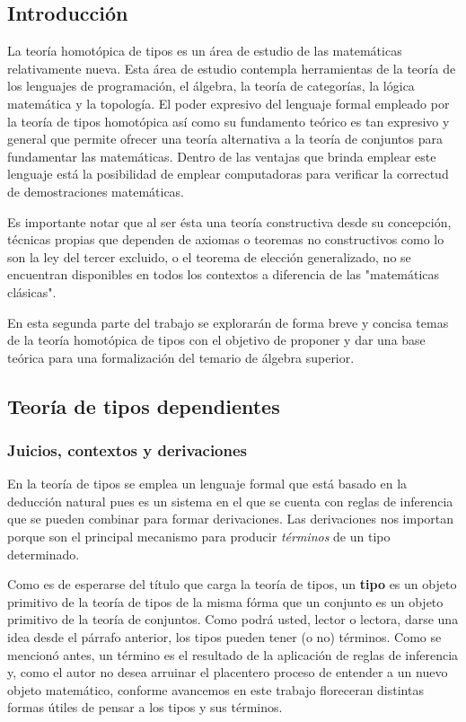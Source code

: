 \documentclass{article}
\begin{document}
\subsection{Introducción}
La teoría homotópica de tipos es un área de estudio de las matemáticas relativamente nueva. 
Esta área de estudio contempla herramientas de la teoría de los lenguajes de programación, el álgebra, la teoría de categorías, la lógica matemática y la topología.
El poder expresivo del lenguaje formal empleado por la teoría de tipos homotópica así como su fundamento teórico es tan expresivo y general que permite
ofrecer una teoría alternativa a la teoría de conjuntos para fundamentar las matemáticas. Dentro de las ventajas que brinda emplear este lenguaje
está la posibilidad de emplear computadoras para verificar la correctud de demostraciones matemáticas.

Es importante notar que al ser ésta una teoría constructiva desde su concepción, técnicas propias que dependen de axiomas o teoremas no constructivos como lo son
la ley del tercer excluido, o el teorema de elección generalizado, no se encuentran disponibles en todos los contextos a diferencia de las "matemáticas clásicas".

En esta segunda parte del trabajo se explorarán de forma breve y concisa temas de la teoría homotópica de tipos con el objetivo
de proponer y dar una base teórica para una formalización del temario de álgebra superior.

\subsection{Teoría de tipos dependientes}
    \subsubsection{Juicios, contextos y derivaciones}
        En la teoría de tipos se emplea un lenguaje formal que está basado en la deducción natural pues es un sistema en el que se cuenta
        con reglas de inferencia que se pueden combinar para formar derivaciones. Las derivaciones nos importan porque son el principal
        mecanismo para producir \textit{términos} de un tipo determinado.
        
        Como es de esperarse del título que carga la teoría de tipos, un \textbf{tipo} es un objeto primitivo de la teoría de tipos de la misma fórma que un conjunto
        es un objeto primitivo de la teoría de conjuntos. Como podrá usted, lector o lectora, darse una idea desde el párrafo anterior, los tipos pueden tener (o no)
        términos. Como se mencionó antes, un término es el resultado de la aplicación de reglas de inferencia y, como el autor no desea arruinar el placentero proceso
        de entender a un nuevo objeto matemático, conforme avancemos en este trabajo floreceran distintas formas útiles de pensar a los tipos y sus términos.
\end{document}
